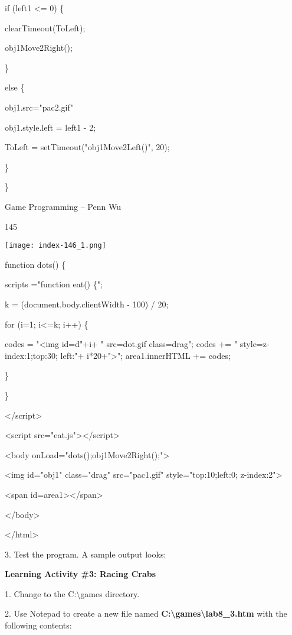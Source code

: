 \documentclass[
]{article}
\begin{document}
if (left1 \textless= 0) \{

clearTimeout(ToLeft);

obj1Move2Right();

\}

else \{

obj1.src="pac2.gif"

obj1.style.left = left1 - 2;

ToLeft = setTimeout("obj1Move2Left()", 20);

\}

\}

Game Programming -- Penn Wu

145

\protect\hypertarget{index_split_009.htmlux5cux23p146}{}{}\texttt{[image: index-146\_1.png]}

function dots() \{

scripts ="function eat() \{";

k = (document.body.clientWidth - 100) / 20;

for (i=1; i\textless=k; i++) \{

codes = "\textless img id=d"+i+ "
src=\textquotesingle dot.gif\textquotesingle{}
class=\textquotesingle drag\textquotesingle"; codes += "
style=\textquotesingle z-index:1;top:30; left:"+
i*20+"\textquotesingle\textgreater"; area1.innerHTML += codes;

\}

\}

\textless/script\textgreater{}

\textless script src="eat.js"\textgreater\textless/script\textgreater{}

\textless body onLoad="dots();obj1Move2Right();"\textgreater{}

\textless img id="obj1" class="drag" src="pac1.gif"
style="top:10;left:0; z-index:2"\textgreater{}

\textless span id=area1\textgreater\textless/span\textgreater{}

\textless/body\textgreater{}

\textless/html\textgreater{}

3. Test the program. A sample output looks:

\textbf{Learning Activity \#3: Racing Crabs}

1. Change to the C:\textbackslash games directory.

2. Use Notepad to create a new file named
\textbf{C:\textbackslash games\textbackslash lab8\_3.htm} with the
following contents:
\end{document}
